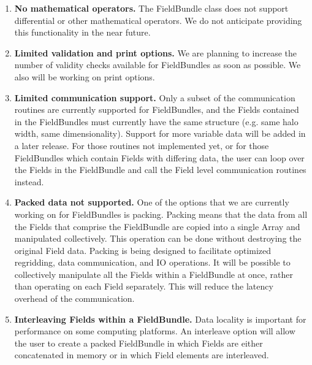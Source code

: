
\label{sec:bundlerest}

\begin{enumerate}
\item{\bf No mathematical operators.}
The FieldBundle class does not support differential or other
mathematical operators.  We do not anticipate providing this 
functionality in the near future.

\item{\bf Limited validation and print options.}
We are planning to increase the number of validity checks available
for FieldBundles as soon as possible.  We also will
be working on print options.

\item{\bf Limited communication support.}
Only a subset of the communication routines are currently supported
for FieldBundles, and the Fields contained in the FieldBundles must currently
have the same structure (e.g. same halo width, same dimensionality). 
Support for more variable data will be added in a later release.
For those routines not implemented yet, or for those FieldBundles which
contain Fields with differing data, the user can loop over the Fields 
in the FieldBundle and call the Field level communication routines instead.

\item{\bf Packed data not supported.}
One of the options that we are currently working on for FieldBundles is
packing.  Packing means that the data from all the
Fields that comprise the FieldBundle are copied into a single Array and
manipulated collectively.  This operation can be done without 
destroying the original Field data.  Packing is being designed to 
facilitate optimized regridding, data communication, and IO operations.  
It will be possible to collectively manipulate all the Fields within 
a FieldBundle at once, rather than operating on each Field separately.  
This will reduce the latency overhead of the communication.  

\item{\bf Interleaving Fields within a FieldBundle.}
Data locality is important for performance on some computing
platforms.  An interleave option will allow the user to create
a packed FieldBundle in which Fields are either concatenated in memory
or in which Field elements are interleaved.

\end{enumerate}




